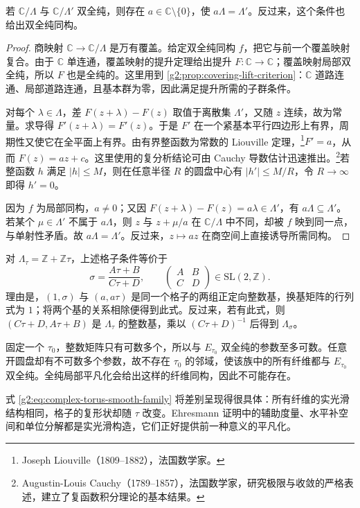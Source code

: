 \begin{lemma}\label{g2:lem:complex-torus-lattices}
	若 \(\mathbb C/\Lambda\) 与 \(\mathbb C/\Lambda'\) 双全纯，则存在 \(a\in\mathbb C\setminus\{0\}\)，使 \(a\Lambda=\Lambda'\)。反过来，这个条件也给出双全纯同构。
\end{lemma}
\begin{proof}
	商映射 \(\mathbb C\to\mathbb C/\Lambda\) 是万有覆盖。给定双全纯同构 \(f\)，把它与前一个覆盖映射复合。由于 \(\mathbb C\) 单连通，覆盖映射的提升定理给出提升 \(F:\mathbb C\to\mathbb C\)；覆盖映射局部双全纯，所以 \(F\) 也是全纯的。这里用到 \cref{g2:prop:covering-lift-criterion}：\(\mathbb C\) 道路连通、局部道路连通，且基本群为零，因此满足提升所需的子群条件。

	对每个 \(\lambda\in\Lambda\)，差 \(F(z+\lambda)-F(z)\) 取值于离散集 \(\Lambda'\)，又随 \(z\) 连续，故为常量。求导得 \(F'(z+\lambda)=F'(z)\)。于是 \(F'\) 在一个紧基本平行四边形上有界，周期性又使它在全平面上有界。由有界整函数为常数的 Liouville 定理，\footnote{Joseph Liouville（1809--1882），法国数学家。}\(F'=a\)，从而 \(F(z)=az+c\)。这里使用的复分析结论可由 Cauchy 导数估计迅速推出。\footnote{Augustin-Louis Cauchy（1789--1857），法国数学家，研究极限与收敛的严格表述，建立了复函数积分理论的基本结果。}若整函数 \(h\) 满足 \(|h|\leq M\)，则在任意半径 \(R\) 的圆盘中心有 \(|h'|\leq M/R\)，令 \(R\to\infty\) 即得 \(h'=0\)。

	因为 \(f\) 为局部同构，\(a\ne0\)；又因 \(F(z+\lambda)-F(z)=a\lambda\in\Lambda'\)，有 \(a\Lambda\subseteq\Lambda'\)。若某个 \(\mu\in\Lambda'\) 不属于 \(a\Lambda\)，则 \(z\) 与 \(z+\mu/a\) 在 \(\mathbb C/\Lambda\) 中不同，却被 \(f\) 映到同一点，与单射性矛盾。故 \(a\Lambda=\Lambda'\)。反过来，\(z\mapsto az\) 在商空间上直接诱导所需同构。
\end{proof}

对 \(\Lambda_\tau=\mathbb Z+\mathbb Z\tau\)，上述格子条件等价于
\begin{equation}\label{g2:eq:torus-modular-equivalence}
	\sigma=\frac{A\tau+B}{C\tau+D},
	\qquad
	\begin{pmatrix}A&B\\C&D\end{pmatrix}\in\mathrm{SL}(2,\mathbb Z).
\end{equation}
理由是，\((1,\sigma)\) 与 \((a,a\tau)\) 是同一个格子的两组正定向整数基，换基矩阵的行列式为 \(1\)；将两个基的关系相除便得到此式。反过来，若有此式，则 \((C\tau+D,A\tau+B)\) 是 \(\Lambda_\tau\) 的整数基，乘以 \((C\tau+D)^{-1}\) 后得到 \(\Lambda_\sigma\)。

固定一个 \(\tau_0\)，整数矩阵只有可数多个，所以与 \(E_{\tau_0}\) 双全纯的参数至多可数。任意开圆盘却有不可数多个参数，故不存在 \(\tau_0\) 的邻域，使该族中的所有纤维都与 \(E_{\tau_0}\) 双全纯。全纯局部平凡化会给出这样的纤维同构，因此不可能存在。

式 \eqref{g2:eq:complex-torus-smooth-family} 将差别呈现得很具体：所有纤维的实光滑结构相同，格子的复形状却随 \(\tau\) 改变。Ehresmann 证明中的辅助度量、水平补空间和单位分解都是实光滑构造，它们正好提供前一种意义的平凡化。
